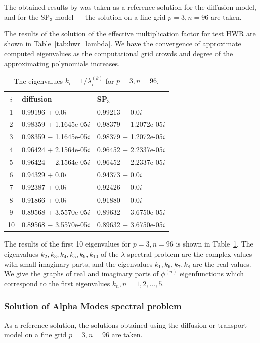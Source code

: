 \documentclass[authoryear]{elsarticle}
\begin{document}
The obtained results by \citep{chao1995} was taken as a reference solution for the diffusion model, and for the $\mathrm{SP_3}$ model ---  the solution on a fine grid $p = 3, n = 96 $ are taken.

The results of the solution of the effective multiplication factor for test HWR are shown in Table~\ref{tab:hwr_lambda}. 
We have the convergence of approximate computed eigenvalues as the computational grid crowds and degree of the approximating polynomials increases.

\begin{table}[h]
\caption{The eigenvalues $k_i=1/\lambda_i^{(k)}$ for $p=3, n=96$.}
\label{tab:hwr_lambda_10}
\begin{center}
\begin{tabular}{c l l }
\hline
$i$ & diffusion & SP$_3$  \\
\hline
1 & 0.99196 + 0.0$i$   & 0.99213 + 0.0$i$\\
2 & 0.98359 + 1.1645e-05$i$   & 0.98379 + 1.2072e-05$i$\\
3 & 0.98359 $-$ 1.1645e-05$i$ & 0.98379 $-$ 1.2072e-05$i$\\
4 & 0.96424 + 2.1564e-05$i$   & 0.96452 + 2.2337e-05$i$\\
5 & 0.96424 $-$ 2.1564e-05$i$ & 0.96452 $-$ 2.2337e-05$i$\\
6 & 0.94329 + 0.0$i$   & 0.94373 + 0.0$i$\\
7 & 0.92387 + 0.0$i$   & 0.92426 + 0.0$i$\\
8 & 0.91866 + 0.0$i$   & 0.91880 + 0.0$i$\\
9 & 0.89568 + 3.5570e-05$i$   & 0.89632 + 3.6750e-05$i$\\
10 & 0.89568 $-$ 3.5570e-05$i$& 0.89632 + 3.6750e-05$i$\\
\hline
\end{tabular}
\end{center}
\end{table}

The results of the first 10 eigenvalues for $ p = 3, n = 96 $ is shown in Table~\ref{tab:hwr_lambda_10}.
The eigenvalues $k_2, k_3, k_4, k_5, k_9, k_{10}$ of the $\lambda$-spectral problem are the complex values with small imaginary parts, and the eigenvalues $k_1, k_6, k_7, k_8$ are the real values. 
We give the graphs of real and imaginary parts of $\phi^{(n)}$ eigenfunctions which correspond to the first eigenvalues $k_n, n = 1, 2, \dots, 5$. 

\subsubsection{Solution of Alpha Modes spectral problem}
As a reference solution, the solutions obtained using the diffusion or transport model on a fine grid $ p = 3, n = 96 $ are taken.
\end{document}
